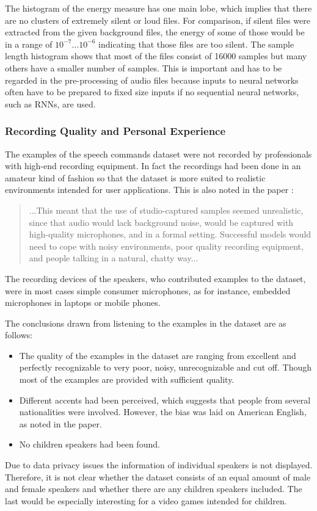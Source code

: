 \FloatBarrier
\noindent
The histogram of the energy measure has one main lobe, which implies that there are no clusters of extremely silent or loud files.
For comparison, if silent files were extracted from the given background files, the energy of some of those would be in a range of $10^{-7} \dots 10^{-6}$ indicating that those files are too silent.
The sample length histogram shows that most of the files consist of 16000 samples but many others have a smaller number of samples. 
This is important and has to be regarded in the pre-processing of audio files because inputs to neural networks often have to be prepared to fixed size inputs if no sequential neural networks, such as RNNs, are used.



\subsubsection{Recording Quality and Personal Experience}
The examples of the speech commands dataset \cite{Warden2018} were not recorded by professionals with high-end recording equipment.
In fact the recordings had been done in an amateur kind of fashion so that the dataset is more suited to realistic environments intended for user applications.
This is also noted in the paper \cite{Warden2018}:
\begin{quote}
...This meant that the use of studio-captured samples seemed unrealistic, since that audio would lack background noise, would be captured with high-quality microphones, and in a formal setting. 
Successful models would need to cope with noisy environments, poor quality recording equipment, and people talking in a natural, chatty way...
\end{quote}
The recording devices of the speakers, who contributed examples to the dataset, were in most cases simple consumer microphones, as for instance, embedded microphones in laptops or mobile phones.

The conclusions drawn from listening to the examples in the dataset are as follows:
\begin{itemize}
  \item The quality of the examples in the dataset are ranging from excellent and perfectly recognizable to very poor, noisy, unrecognizable and cut off. Though most of the examples are provided with sufficient quality.
  \item Different accents had been perceived, which suggests that people from several nationalities were involved.
  However, the bias was laid on American English, as noted in the paper.
  \item No children speakers had been found.
\end{itemize}
Due to data privacy issues the information of individual speakers is not displayed.
Therefore, it is not clear whether the dataset consists of an equal amount of male and female speakers and whether there are any children speakers included.
The last would be especially interesting for a video games intended for children.

